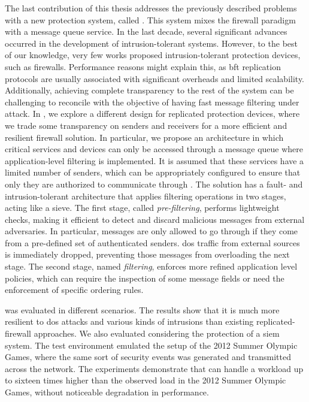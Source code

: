 The last contribution of this thesis addresses the previously described problems with a new protection system, called \sieveq.
This system mixes the firewall paradigm with a message queue service.
In the last decade, several significant advances occurred in the development of intrusion-tolerant systems.
However, to the best of our knowledge, very few works proposed intrusion-tolerant protection devices, such as firewalls.
Performance reasons might explain this, as \gls{bft} replication protocols are usually associated with significant overheads and limited scalability.
Additionally, achieving complete transparency to the rest of the system can be challenging to reconcile with the objective of having fast message filtering under attack.
In \sieveq, we explore a different design for replicated protection devices, where we trade some transparency on senders and receivers for a more efficient and resilient firewall solution.
In particular, we propose an architecture in which critical services and devices can only be accessed through a message queue where application-level filtering is implemented.
It is assumed that these services have a limited number of senders, which can be appropriately configured to ensure that only they are authorized to communicate through \sieveq.
The solution has a fault- and intrusion-tolerant architecture that applies filtering operations in two stages, acting like a sieve.
The first stage, called \emph{pre-filtering}, performs lightweight checks, making it efficient to detect and discard malicious messages from external adversaries.
In particular, messages are only allowed to go through if they come from a pre-defined set of authenticated senders.
\gls{dos} traffic from external sources is immediately dropped, preventing those messages from overloading the next stage.
The second stage, named \emph{filtering}, enforces more refined application level policies, which can require the inspection of some message fields or need the enforcement of specific ordering rules.


\sieveq was evaluated in different scenarios.
The results show that it is much more resilient to \gls{dos} attacks and various kinds of intrusions than existing replicated-firewall approaches.
We also evaluated \sieveq considering the protection of a \gls{siem} system.
The test environment emulated the setup of the 2012 Summer Olympic Games, where the same sort of security events was generated and transmitted across the network. 
The experiments demonstrate that \sieveq can handle a workload up to sixteen times higher than the observed load in the 2012 Summer Olympic Games, without noticeable degradation in performance.



